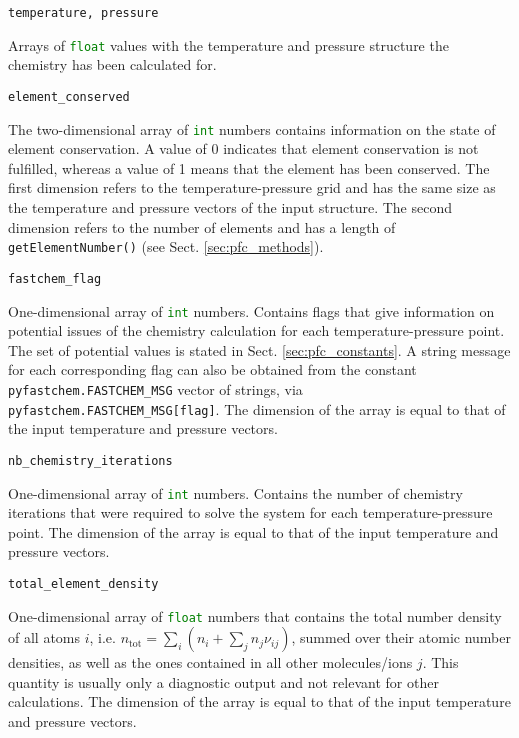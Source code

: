 \documentclass[numbers=noenddot]{aux/fcmanual}
\begin{document}
\lstinline[language=Python]!temperature, pressure!
\begin{addmargin}[25pt]{0pt}
	Arrays of \lstinline[language=Python]!float! values with the temperature and pressure structure the chemistry has been calculated for.
\end{addmargin}

\bigbreak

\lstinline!element_conserved!
\begin{addmargin}[25pt]{0pt}
	The two-dimensional array of \lstinline[language=Python]!int! numbers contains information on the state of element conservation. A value of 0 indicates that element conservation is not fulfilled, whereas a value of 1 means that the element has been conserved. The first dimension refers to the temperature-pressure grid and has the same size as the temperature and pressure vectors of the input structure. The second dimension refers to the number of elements and has a length of \lstinline!getElementNumber()! (see Sect. \ref{sec:pfc_methods}).
\end{addmargin}

\bigbreak

\lstinline!fastchem_flag!
\begin{addmargin}[25pt]{0pt}
	One-dimensional array of \lstinline[language=Python]!int! numbers. Contains flags that give information on potential issues of the chemistry calculation for each temperature-pressure point. The set of potential values is stated in Sect. \ref{sec:pfc_constants}. A string message for each corresponding flag can also be obtained from the constant \lstinline!pyfastchem.FASTCHEM_MSG! vector of strings, via \lstinline!pyfastchem.FASTCHEM_MSG[flag]!. The dimension of the array is equal to that of the input temperature and pressure vectors.
\end{addmargin}

\bigbreak

\lstinline!nb_chemistry_iterations!
\begin{addmargin}[25pt]{0pt}
	One-dimensional array of \lstinline[language=Python]!int! numbers. Contains the number of chemistry iterations that were required to solve the system for each temperature-pressure point. The dimension of the array is equal to that of the input temperature and pressure vectors.
\end{addmargin}

\bigbreak

\lstinline!total_element_density!
\begin{addmargin}[25pt]{0pt}
	One-dimensional array of \lstinline[language=Python]!float! numbers that contains the total number density of all atoms $i$, i.e. $n_\mathrm{tot} = \sum_i \left( n_i + \sum_j n_j \nu_{ij} \right)$, summed over their atomic number densities, as well as the ones contained in all other molecules/ions $j$. This quantity is usually only a diagnostic output and not relevant for other calculations. The dimension of the array is equal to that of the input temperature and pressure vectors.
\end{addmargin}
\end{document}
